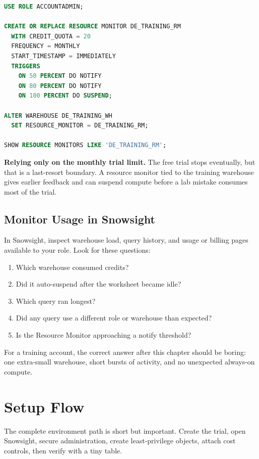 \begin{lstlisting}[language=SQL,caption={Creating a resource monitor that suspends the training warehouse.},label={lst:chapter0-resource-monitor}]
USE ROLE ACCOUNTADMIN;

CREATE OR REPLACE RESOURCE MONITOR DE_TRAINING_RM
  WITH CREDIT_QUOTA = 20
  FREQUENCY = MONTHLY
  START_TIMESTAMP = IMMEDIATELY
  TRIGGERS
    ON 50 PERCENT DO NOTIFY
    ON 80 PERCENT DO NOTIFY
    ON 100 PERCENT DO SUSPEND;

ALTER WAREHOUSE DE_TRAINING_WH
  SET RESOURCE_MONITOR = DE_TRAINING_RM;

SHOW RESOURCE MONITORS LIKE 'DE_TRAINING_RM';
\end{lstlisting}

\begin{pitfall}
\textbf{Relying only on the monthly trial limit.} The free trial stops eventually, but that is a last-resort boundary. A resource monitor tied to the training warehouse gives earlier feedback and can suspend compute before a lab mistake consumes most of the trial.
\end{pitfall}

\subsection{Monitor Usage in Snowsight}
In Snowsight, inspect warehouse load, query history, and usage or billing pages available to your role. Look for these questions:
\begin{enumerate}
    \item Which warehouse consumed credits?
    \item Did it auto-suspend after the worksheet became idle?
    \item Which query ran longest?
    \item Did any query use a different role or warehouse than expected?
    \item Is the Resource Monitor approaching a notify threshold?
\end{enumerate}

For a training account, the correct answer after this chapter should be boring: one extra-small warehouse, short bursts of activity, and no unexpected always-on compute.

\section{Setup Flow}
The complete environment path is short but important. Create the trial, open Snowsight, secure administration, create least-privilege objects, attach cost controls, then verify with a tiny table.

